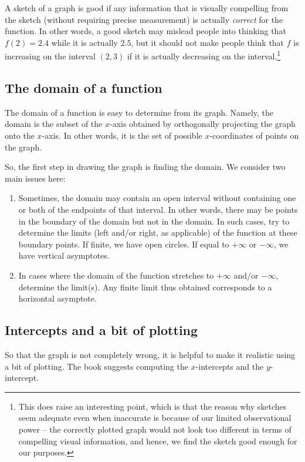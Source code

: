 \documentclass[10pt]{amsart}
\begin{document}
A sketch of a graph is good if any information that is visually
compelling from the sketch (without requiring precise measurement) is
actually {\em correct} for the function. In other words, a good sketch
may mislead people into thinking that $f(2) = 2.4$ while it is
actually $2.5$, but it should not make people think that $f$ is
increasing on the interval $(2,3)$ if it is actually decreasing on the
interval.\footnote{This does raise an interesting point, which is that
the reason why sketches seem adequate even when inaccurate is because
of our limited observational power -- the correctly plotted graph
would not look too different in terms of compelling visual
information, and hence, we find the sketch good enough for our
purposes.}

\subsection{The domain of a function}

The domain of a function is easy to determine from its graph. Namely,
the domain is the subset of the $x$-axis obtained by orthogonally
projecting the graph onto the $x$-axis. In other words, it is the set
of possible $x$-coordinates of points on the graph.

So, the first step in drawing the graph is finding the domain. We
consider two main issues here:

\begin{enumerate}
\item Sometimes, the domain may contain an open interval without
  containing one or both of the endpoints of that interval. In other
  words, there may be points in the boundary of the domain but not in
  the domain. In such cases, try to determine the limits (left and/or
  right, as applicable) of the function at these boundary points. If
  finite, we have open circles. If equal to $+\infty$ or $-\infty$, we
  have vertical asymptotes.
\item In cases where the domain of the function stretches to $+\infty$
  and/or $-\infty$, determine the limit(s). Any finite limit thus
  obtained corresponds to a horizontal asymptote.
\end{enumerate}

\subsection*{Intercepts and a bit of plotting}

So that the graph is not completely wrong, it is helpful to make it
realistic using a bit of plotting. The book suggests computing the
$x$-intercepts and the $y$-intercept.
\end{document}
